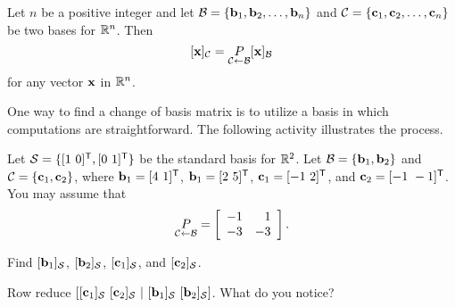 \begin{theorem} \label{thm:3_e_COB} Let $n$ be a positive integer and let $\mathcal{B} = \{\mathbf{b}_1, \mathbf{b}_2, \ldots, \mathbf{b}_n\}$ and $\mathcal{C} = \{\mathbf{c}_1, \mathbf{c}_2, \ldots, \mathbf{c}_n\}$ be two bases for $\mathbb{R}^n$. Then
\[[\mathbf{x}]_{\mathcal{C}} = \underset{\mathcal{C} \leftarrow \mathcal{B}}{P}[\mathbf{x}]_{\mathcal{B}}\]
for any vector $\mathbf{x}$ in $\mathbb{R}^n$.
\end{theorem}

One way to find a change of basis matrix is to utilize a basis in which computations are straightforward. The following activity illustrates the process.

\begin{activity}  \label{act:3_e_COB_standard_basis} Let $\mathcal{S} = \{[1 \ 0]^{\mathsf{T}}, [0 \ 1]^{\mathsf{T}}\}$ be the standard basis for $\mathbb{R}^2$. Let $\mathcal{B} = \{\mathbf{b}_1, \mathbf{b}_2\}$ and $\mathcal{C} = \{\mathbf{c}_1, \mathbf{c}_2\}$, where $\mathbf{b}_1 = [4 \ 1]^{\mathsf{T}}$, $\mathbf{b}_1 =  [2 \ 5]^{\mathsf{T}}$, $\mathbf{c}_1 = [-1 \ 2]^{\mathsf{T}}$, and $\mathbf{c}_2 = [-1 \ -1]^{\mathsf{T}}$. You may assume that 
\[\underset{\mathcal{C} \leftarrow \mathcal{B}}{P} = \left[ \begin{array}{rr} -1&1 \\ -3&-3 \end{array} \right].\]
\ba
\item Find $[\mathbf{b}_1]_{\mathcal{S}}$, $[\mathbf{b}_2]_{\mathcal{S}}$, $[\mathbf{c}_1]_{\mathcal{S}}$, and  $[\mathbf{c}_2]_{\mathcal{S}}$.  

\item Row reduce $[[\mathbf{c}_1]_{\mathcal{S}} \ [\mathbf{c}_2]_{\mathcal{S}} \ | \ [\mathbf{b}_1]_{\mathcal{S}} \ [\mathbf{b}_2]_{\mathcal{S}}]$. What do you notice?

\ea

\end{activity} 

